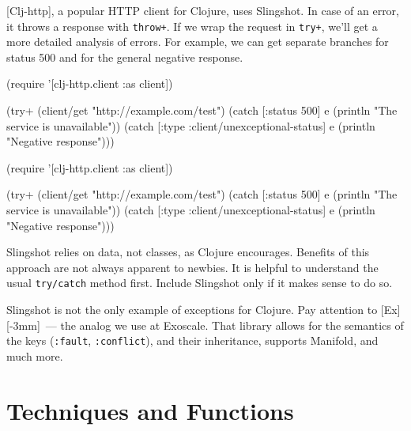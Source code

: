 [Clj-http], a popular HTTP client for Clojure, uses Slingshot. In case of an error, it throws a response with \verb|throw+|. If we wrap the request in \verb|try+|, we'll get a more detailed analysis of errors. For example, we can get separate branches for status 500 and for the general negative response.

\ifx\DEVICETYPE\MOBILE

\begin{english}
  \begin{clojure}
(require '[clj-http.client :as client])

(try+
 (client/get "http://example.com/test")
 (catch [:status 500] e
  (println "The service is unavailable"))
 (catch
  [:type :client/unexceptional-status] e
  (println "Negative response")))
  \end{clojure}
\end{english}

\else

\begin{english}
  \begin{clojure}
(require '[clj-http.client :as client])

(try+
 (client/get "http://example.com/test")
 (catch [:status 500] e
   (println "The service is unavailable"))
 (catch [:type :client/unexceptional-status] e
   (println "Negative response")))
  \end{clojure}
\end{english}

\fi

Slingshot relies on data, not classes, as Clojure encourages. Benefits of this approach are not always apparent to newbies. It is helpful to understand the usual \verb|try/catch| method first. Include Slingshot only if it makes sense to do so.


Slingshot is not the only example of exceptions for Clojure. Pay attention to [Ex][-3mm]~--- the analog we use at Exoscale.
That library allows for the semantics of the keys (\verb|:fault|, \verb|:conflict|), and their inheritance, supports Manifold, and much more.

\section{ Techniques and Functions }

